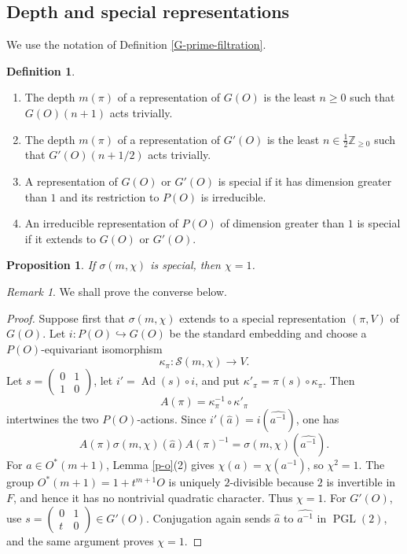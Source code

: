 \documentclass[11pt,a4paper,twoside]{amsart}
\newtheorem{proposition}[theorem]{Proposition}
\theoremstyle{definition}
\newtheorem{definition}[theorem]{Definition}
\theoremstyle{remark}
\newtheorem{remark}[theorem]{Remark}
\newcommand{\ho}{\hookrightarrow}
\newcommand{\bs}{\sigma}
\newcommand{\kk}{\kappa}
\newcommand{\mcS}{\mathcal S}
\newcommand{\ZZ}{\mathbb Z}
\newcommand{\Ad}{\operatorname{Ad}}
\newcommand{\PGL}{\operatorname{PGL}}
\begin{document}
\subsection{Depth and special representations}
We use the notation of Definition \ref{G-prime-filtration}.
\begin{definition}\label{depth}
\begin{enumerate}
\item The depth $m(\pi)$ of a representation of $G(O)$ is the least $n\geq0$ such that $G(O)(n+1)$ acts trivially.
\item The depth $m(\pi)$ of a representation of $G'(O)$ is the least $n\in\frac12\ZZ_{\geq0}$ such that $G'(O)(n+1/2)$ acts trivially.
\item A representation of $G(O)$ or $G'(O)$ is special if it has dimension greater than $1$ and its restriction to $P(O)$ is irreducible.
\item An irreducible representation of $P(O)$ of dimension greater than $1$ is special if it extends to $G(O)$ or $G'(O)$.
\end{enumerate}
\end{definition}
\begin{proposition}\label{eq}
If $\bs(m,\chi)$ is special, then $\chi=1$.
\end{proposition}
\begin{remark}
We shall prove the converse below.
\end{remark}
\begin{proof}
Suppose first that $\bs(m,\chi)$ extends to a special representation $(\pi,V)$ of $G(O)$. Let $i:P(O)\ho G(O)$ be the standard embedding and choose a $P(O)$-equivariant isomorphism
$$
\kk_\pi:\mcS(m,\chi)\longrightarrow V.
$$
Let $s=\begin{pmatrix}0&1\\1&0\end{pmatrix}$, let $i'=\Ad(s)\circ i$, and put $\kk'_\pi=\pi(s)\circ\kk_\pi$. Then
$$
A(\pi)=\kk_\pi^{-1}\circ\kk'_\pi
$$
intertwines the two $P(O)$-actions. Since $i'(\widehat a)=i(\widehat{a^{-1}})$, one has
$$
A(\pi)\bs(m,\chi)(\widehat a)A(\pi)^{-1}=\bs(m,\chi)(\widehat{a^{-1}}).
$$
For $a\in O^*(m+1)$, Lemma \ref{p-o}(2) gives $\chi(a)=\chi(a^{-1})$, so $\chi^2=1$. The group $O^*(m+1)=1+t^{m+1}O$ is uniquely $2$-divisible because $2$ is invertible in $F$, and hence it has no nontrivial quadratic character. Thus $\chi=1$.
For $G'(O)$, use $s=\begin{pmatrix}0&1\\t&0\end{pmatrix}\in G'(O)$. Conjugation again sends $\widehat a$ to $\widehat{a^{-1}}$ in $\PGL(2)$, and the same argument proves $\chi=1$.
\end{proof}
\end{document}
